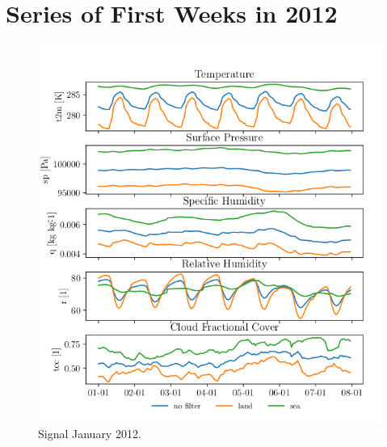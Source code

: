 \chapter{Series of First Weeks in 2012} \label{app:first_week}
\begin{figure}[ht]
    \centering
    \includegraphics{python_figs/spatially_averaged_one_week_from_2012-01-01.png}
    \caption{Signal January 2012.}
    \label{fig:jan12}
\end{figure}
